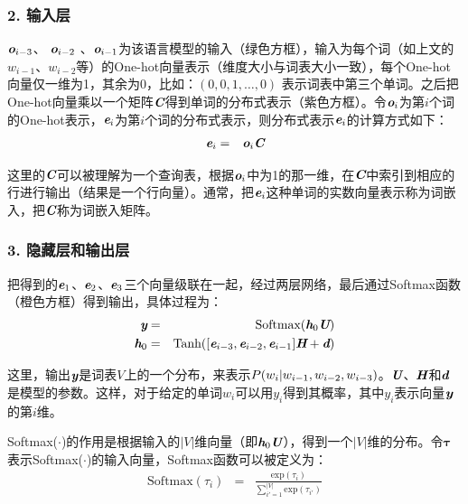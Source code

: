 \subsubsection{2. 输入层}

\parinterval  $ {\textbf{\em o}}_{i-3} $、 $ {\textbf{\em o}}_{i-2} $ 、$ {\textbf{\em o}}_{i-1} $为该语言模型的输入（绿色方框），输入为每个词（如上文的$ w_{i-1}$、$ w_{i-2}$等）的One-hot向量表示（维度大小与词表大小一致），每个One-hot向量仅一维为1，其余为0，比如：$ (0,0,1,\dots,0) $ 表示词表中第三个单词。之后把One-hot向量乘以一个矩阵$ \textbf{\em C} $得到单词的分布式表示（紫色方框）。令$ {\textbf{\em o}}_i $为第$ i $个词的One-hot表示，$ {\textbf{\em e}}_i $为第$ i $个词的分布式表示，则分布式表示$ {\textbf{\em e}}_i $的计算方式如下：
\begin{eqnarray}
{\textbf{\em e}}_i&=&{\textbf{\em o}}_i{\textbf{\em C}}
\label{eq:9-60}
\end{eqnarray}

\noindent  这里的$ \textbf{\em C} $可以被理解为一个查询表，根据$ {\textbf{\em o}}_i $中为1的那一维，在$ \textbf{\em C}$中索引到相应的行进行输出（结果是一个行向量）。通常，把${\textbf{\em e}}_i$这种单词的实数向量表示称为词嵌入，把$ \textbf{\em C} $称为词嵌入矩阵。


\subsubsection{3. 隐藏层和输出层}

\parinterval  把得到的$ {\textbf{\em e}}_1 $、$ {\textbf{\em e}}_2 $、$ {\textbf{\em e}}_3 $三个向量级联在一起，经过两层网络，最后通过Softmax函数（橙色方框）得到输出，具体过程为：
\begin{eqnarray}
{\textbf{\em y}}&=&{\textrm{Softmax}}({\textbf{\em h}}_0{\textbf{\em U}})\label{eq:9-61}\\
{\textbf{\em h}}_0&=&{\textrm{Tanh}}([{\textbf{\em e}}_{i-3},{\textbf{\em e}}_{i-2},{\textbf{\em e}}_{i-1}]{\textbf{\em H}}+{\textbf{\em d}})
\label{eq:9-62}
\end{eqnarray}

\noindent  这里，输出$ {\textbf{\em y}}$是词表$V$上的一个分布，来表示${P}(w_i|w_{i-1},w_{i-2},w_{i-3}) $。$ {\textbf{\em U}}$、${\textbf{\em H}}$和${\textbf{\em d}}$是模型的参数。这样，对于给定的单词$w_i$可以用$y_i$得到其概率，其中$y_i$表示向量${\textbf{\em y}}$的第$i$维。

\parinterval Softmax($\cdot$)的作用是根据输入的$|V|$维向量（即${\textbf{\em h}}_0{\textbf{\em U}}$），得到一个$|V|$维的分布。令${\bm \tau}$表示Softmax($\cdot$)的输入向量，Softmax函数可以被定义为：
\begin{eqnarray}
\textrm{Softmax}(\tau_i)&=&\frac{\textrm{exp}(\tau_i)}  {\sum_{i'=1}^{|V|} \textrm{exp}(\tau_{i'})}
\label{eq:9-120}
\end{eqnarray}

